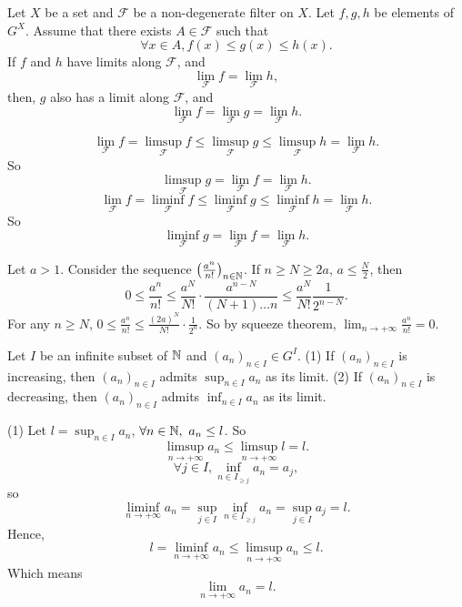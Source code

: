 \begin{theoremenv}
    Let $X$ be a set and $\mathcal{F}$ be a non-degenerate filter on $X$. Let $f,g,h$ be elements of $G^X$. Assume that there exists $A\in \mathcal{F}$ such that 
    $$\forall x\in A, f(x)\le g(x)\le h(x).$$
    If $f$ and $h$ have limits along $\mathcal{F}$, and 
    $$\lim_{\mathcal{F}}f=\lim_{\mathcal{F}}h,$$
    then, $g$ also has a limit along $\mathcal{F}$, and 
    $$\lim_{\mathcal{F}}f=\lim_{\mathcal{F}}g=\lim_{\mathcal{F}}h.$$
\end{theoremenv}
\begin{proofenv}
    $$\lim_{\mathcal{F}}f=\limsup_{\mathcal{F}}f\le \limsup_{\mathcal{F}}g\le \limsup_{\mathcal{F}}h=\lim_{\mathcal{F}}h.$$
    So 
    $$\limsup_{\mathcal{F}} g=\lim_{\mathcal{F}}f=\lim_{\mathcal{F}}h.$$
    $$\lim_{\mathcal{F}}f=\liminf_{\mathcal{F}}f\le \liminf_{\mathcal{F}}g\le \liminf_{\mathcal{F}}h=\lim_{\mathcal{F}}h.$$
    So 
    $$\liminf_{\mathcal{F}} g=\lim_{\mathcal{F}}f=\lim_{\mathcal{F}}h.$$
\end{proofenv}
\begin{exampleenv}
    Let $a>1$. Consider the sequence $\left(\frac{a^n}{n!}\right)_{n\in \mathbb{N}}$. If $n\ge N\ge 2a $, $a\le \frac{N}{2}$, then 
    $$0\le \frac{a^n}{n!}\le \frac{a^N}{N!}\cdot\frac{a^{n-N}}{(N+1)\dots n}\le \frac{a^N}{N!}\frac{1}{2^{n-N}}.$$
    For any $n\ge N$, $0\le \frac{a^n}{n!}\le \frac{(2a)^N}{N!}\cdot \frac{1}{2^n}.$ So by squeeze theorem, $\displaystyle\lim_{n\rightarrow+\infty}\frac{a^n}{n!}=0$.
\end{exampleenv}
\begin{theoremenv}
    Let $I$ be an infinite subset of $\mathbb{N}$ and $(a_n)_{n\in I}\in G^I$.
    \newline
    (1) If $(a_n)_{n\in I}$ is increasing, then $(a_n)_{n\in I}$ admits $\displaystyle \sup_{n\in I}a_n$ as its limit.
    \newline
    (2) If $(a_n)_{n\in I}$ is decreasing, then $(a_n)_{n\in I}$ admits $\displaystyle \inf_{n\in I}a_n$ as its limit.
    
\end{theoremenv}
\begin{proofenv}
    \quad\newline
    (1) Let $l=\sup_{n\in I} a_n$, $\forall n\in \mathbb{N},\ a_n\le l$. So 
    $$\limsup_{n\rightarrow +\infty}a_n\le\limsup_{n\rightarrow +\infty}l=l.$$
    $$\forall j\in I, \inf_{n\in I_{\ge j}}a_n=a_j,$$
    so $$\liminf_{n\rightarrow+\infty}a_n=\sup_{j\in I}\inf_{n\in I_{\ge j}}a_n=\sup_{j\in I}a_j=l.$$
    Hence,
    $$l=\liminf_{n\rightarrow+\infty}a_n\le \limsup_{n\rightarrow+\infty}a_n\le l .$$
    Which means 
    $$\lim_{n\rightarrow +\infty}a_n=l.$$
\end{proofenv}

